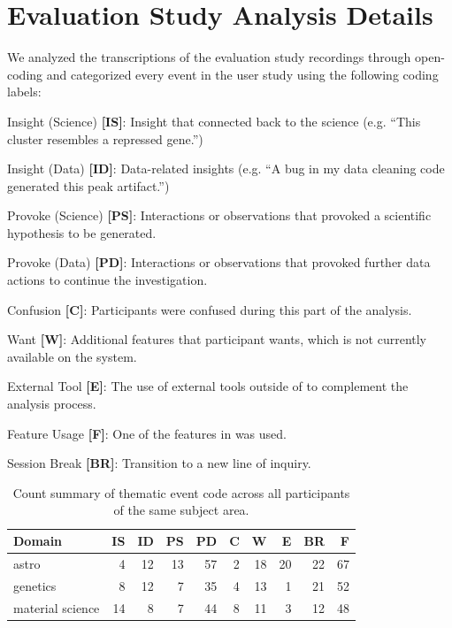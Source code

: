 \section{Evaluation Study Analysis Details\label{apdx:studydetails}}
We analyzed the transcriptions of the evaluation study recordings through open-coding and
categorized every event in the user study using the following coding labels:
\begin{denselist}
    \item Insight (Science) \textbf{[IS]}: Insight that connected back to the science (e.g. ``This cluster resembles a repressed gene.'')
    \item Insight (Data) \textbf{[ID]}: Data-related insights (e.g. ``A bug in my data cleaning code generated this peak artifact.'')
    \item Provoke (Science) \textbf{[PS]}: Interactions or observations that provoked a scientific hypothesis to be generated.
    \item Provoke (Data) \textbf{[PD]}: Interactions or observations that provoked further data actions to continue the investigation.
    \item Confusion \textbf{[C]}: Participants were confused during this part of the analysis.
    \item Want \textbf{[W]}: Additional features that participant wants, which is not currently available on the system.
    \item External Tool \textbf{[E]}: The use of external tools outside of \zvpp to complement the analysis process.
    \item Feature Usage \textbf{[F]}: One of the features in \zvpp was used.
    \item Session Break \textbf{[BR]}: Transition to a new line of inquiry.
\end{denselist}

\begin{table}[h!]
  \begin{tabular}{lrrrrrrrrr}
  \hline
   Domain           &   IS &   ID &   PS &   PD &   C &   W &   E &   BR &   F \\
  \hline
   astro            &    4 &   12 &   13 &   57 &   2 &  18 &  20 &   22 &  67 \\
   genetics         &    8 &   12 &    7 &   35 &   4 &  13 &   1 &   21 &  52 \\
   material science &   14 &    8 &    7 &   44 &   8 &  11 &   3 &   12 &  48 \\
  \hline
  \end{tabular}
  \caption{Count summary of thematic event code across all participants of the same subject area.}
\end{table}

